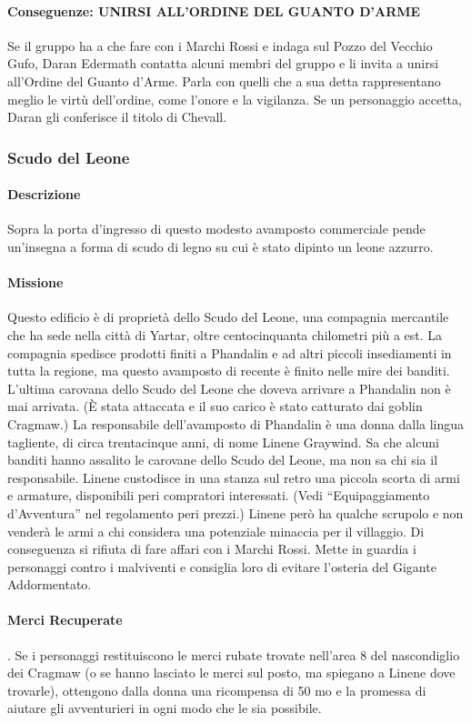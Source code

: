 \documentclass{article}
\begin{document}
\paragraph{Conseguenze: UNIRSI ALL'ORDINE DEL GUANTO D'ARME }
Se il gruppo ha a che fare con i Marchi Rossi e indaga sul
Pozzo del Vecchio Gufo, Daran Edermath contatta alcuni
membri del gruppo e li invita a unirsi all'Ordine del Guanto
d’Arme. Parla con quelli che a sua detta rappresentano
meglio le virtù dell'ordine, come l'onore e la vigilanza. Se un
personaggio accetta, Daran gli conferisce il titolo di Chevall.  

\subsubsection{Scudo del Leone}
\paragraph{Descrizione}
Sopra la porta d’ingresso di questo modesto avamposto
commerciale pende un'insegna a forma di scudo di legno su
cui è stato dipinto un leone azzurro.
\paragraph{Missione}
Questo edificio è di proprietà dello Scudo del Leone, una
compagnia mercantile che ha sede nella città di Yartar, oltre
centocinquanta chilometri più a est. La compagnia spedisce
prodotti finiti a Phandalin e ad altri piccoli insediamenti in
tutta la regione, ma questo avamposto di recente è finito nelle
mire dei banditi. L'ultima carovana dello Scudo del Leone
che doveva arrivare a Phandalin non è mai arrivata. (È stata
attaccata e il suo carico è stato catturato dai goblin Cragmaw.)
La responsabile dell’avamposto di Phandalin è una donna
dalla lingua tagliente, di circa trentacinque anni, di nome
Linene Graywind. Sa che alcuni banditi hanno assalito
le carovane dello Scudo del Leone, ma non sa chi sia il
responsabile.
Linene custodisce in una stanza sul retro una piccola
scorta di armi e armature, disponibili peri compratori
interessati. (Vedi “Equipaggiamento d’Avventura” nel
regolamento peri prezzi.) Linene però ha qualche scrupolo e
non venderà le armi a chi considera una potenziale minaccia
per il villaggio. Di conseguenza si rifiuta di fare affari con
i Marchi Rossi. Mette in guardia i personaggi contro i
malviventi e consiglia loro di evitare l’osteria del Gigante
Addormentato.
\paragraph{Merci Recuperate}. Se i personaggi restituiscono le merci
rubate trovate nell’area 8 del nascondiglio dei Cragmaw (o se
hanno lasciato le merci sul posto, ma spiegano a Linene dove
trovarle), ottengono dalla donna una ricompensa di 50 mo e
la promessa di aiutare gli avventurieri in ogni modo che le
sia possibile.
\end{document}

